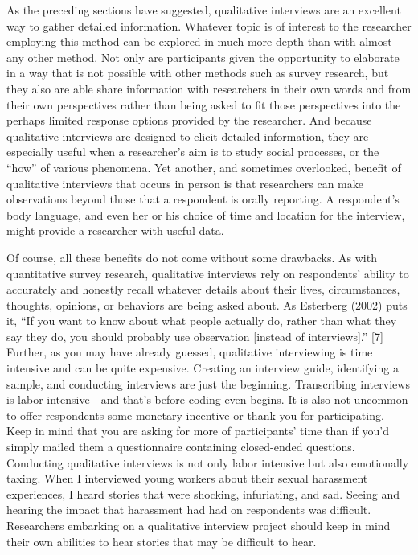 As the preceding sections have suggested, qualitative interviews are an excellent way to gather detailed information. Whatever topic is of interest to the researcher employing this method can be explored in much more depth than with almost any other method. Not only are participants given the opportunity to elaborate in a way that is not possible with other methods such as survey research, but they also are able share information with researchers in their own words and from their own perspectives rather than being asked to fit those perspectives into the perhaps limited response options provided by the researcher. And because qualitative interviews are designed to elicit detailed information, they are especially useful when a researcher’s aim is to study social processes, or the “how” of various phenomena. Yet another, and sometimes overlooked, benefit of qualitative interviews that occurs in person is that researchers can make observations beyond those that a respondent is orally reporting. A respondent’s body language, and even her or his choice of time and location for the interview, might provide a researcher with useful data.

Of course, all these benefits do not come without some drawbacks. As with quantitative survey research, qualitative interviews rely on respondents’ ability to accurately and honestly recall whatever details about their lives, circumstances, thoughts, opinions, or behaviors are being asked about. As Esterberg (2002) puts it, “If you want to know about what people actually do, rather than what they say they do, you should probably use observation [instead of interviews].” [7] Further, as you may have already guessed, qualitative interviewing is time intensive and can be quite expensive. Creating an interview guide, identifying a sample, and conducting interviews are just the beginning. Transcribing interviews is labor intensive—and that’s before coding even begins. It is also not uncommon to offer respondents some monetary incentive or thank-you for participating. Keep in mind that you are asking for more of participants’ time than if you’d simply mailed them a questionnaire containing closed-ended questions. Conducting qualitative interviews is not only labor intensive but also emotionally taxing. When I interviewed young workers about their sexual harassment experiences, I heard stories that were shocking, infuriating, and sad. Seeing and hearing the impact that harassment had had on respondents was difficult. Researchers embarking on a qualitative interview project should keep in mind their own abilities to hear stories that may be difficult to hear.
